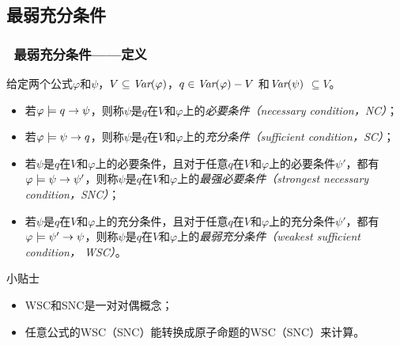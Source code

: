 \documentclass[9pt, CJK]{beamer}
\begin{document}
	\subsection{最弱充分条件}
	\begin{frame}
		\frametitle{~最弱充分条件——{\footnotesize 定义}}
		{\footnotesize
			\begin{definition}[充分和必要条件]\label{def:NC:SC}
				给定两个公式$\varphi$和$\psi$，$V \subseteq \textit{Var}(\varphi)$，$q\in\textit{Var}(\varphi)- V$
				和$\textit{Var}(\psi)$ $\subseteq V$。
				\begin{itemize}
					\item 若$\varphi \models q \rightarrow \psi$，则称$\psi$是$q$在$V$和$\varphi$上的{\em 必要条件（necessary condition，NC）}；
					\item 若$\varphi \models \psi\rightarrow q$，则称$\psi$是$q$在$V$和$\varphi$上的{\em 充分条件（sufficient condition，SC）}；
					\item 若$\psi$是$q$在$V$和$\varphi$上的必要条件，且对于任意$q$在$V$和$\varphi$上的必要条件$\psi'$，都有$\varphi\models\psi\rightarrow\psi'$，则称$\psi$是$q$在$V$和$\varphi$上的{\em 最强必要条件（strongest necessary condition，SNC）}；
					\item 若$\psi$是$q$在$V$和$\varphi$上的充分条件，且对于任意$q$在$V$和$\varphi$上的充分条件$\psi'$，都有$\varphi\models\psi'\rightarrow\psi$，则称$\psi$是$q$在$V$和$\varphi$上的{\em 最弱充分条件（weakest sufficient condition， WSC）}。
				\end{itemize}
			\end{definition}
			{\tiny \begin{block}{{\scriptsize 小贴士}}
					\begin{itemize}
						\item WSC和SNC是一对对偶概念；
						\item 任意公式的WSC（SNC）能转换成原子命题的WSC（SNC）来计算。
					\end{itemize}
			\end{block}}
		}
	\end{frame}
\end{document}
